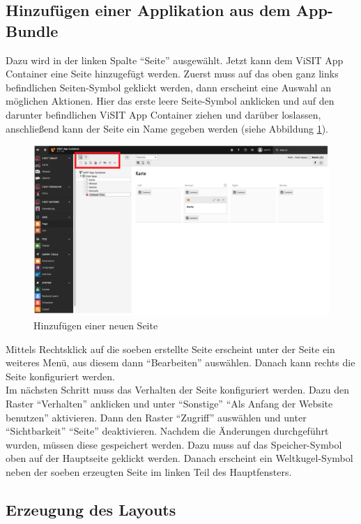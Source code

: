 \subsection{Hinzufügen einer Applikation aus dem App-Bundle}

Dazu wird in der linken Spalte “Seite” ausgewählt. Jetzt kann dem ViSIT App Container eine Seite hinzugefügt werden. Zuerst muss auf das oben ganz links befindlichen Seiten-Symbol geklickt werden, dann erscheint eine Auswahl an möglichen Aktionen. Hier das erste leere Seite-Symbol anklicken und auf den darunter befindlichen ViSIT App Container ziehen und darüber loslassen, anschließend kann der Seite ein Name gegeben werden (siehe Abbildung \ref{img:neue_seite_hinzufuegen}).

\begin{figure}[ht!]
\centering
\includegraphics[width=12cm]{Figures/paula/neue_seite_hinzufuegen.png}
\caption{Hinzufügen einer neuen Seite}
\label{img:neue_seite_hinzufuegen}
\end{figure}

Mittels Rechtsklick auf die soeben erstellte Seite erscheint unter der Seite ein weiteres Menü, aus diesem dann “Bearbeiten” auswählen. Danach kann rechts die Seite konfiguriert werden.\\
Im nächsten Schritt muss das Verhalten der Seite konfiguriert werden. Dazu den Raster “Verhalten” anklicken und unter “Sonstige” “Als Anfang der Website benutzen” aktivieren.
Dann den Raster “Zugriff” auswählen und unter “Sichtbarkeit” “Seite” deaktivieren.
Nachdem die Änderungen durchgeführt wurden, müssen diese gespeichert werden. Dazu muss auf das Speicher-Symbol oben auf der Hauptseite geklickt werden. Danach erscheint ein Weltkugel-Symbol neben der soeben erzeugten Seite im linken Teil des Hauptfensters.

\subsection{Erzeugung des Layouts}

